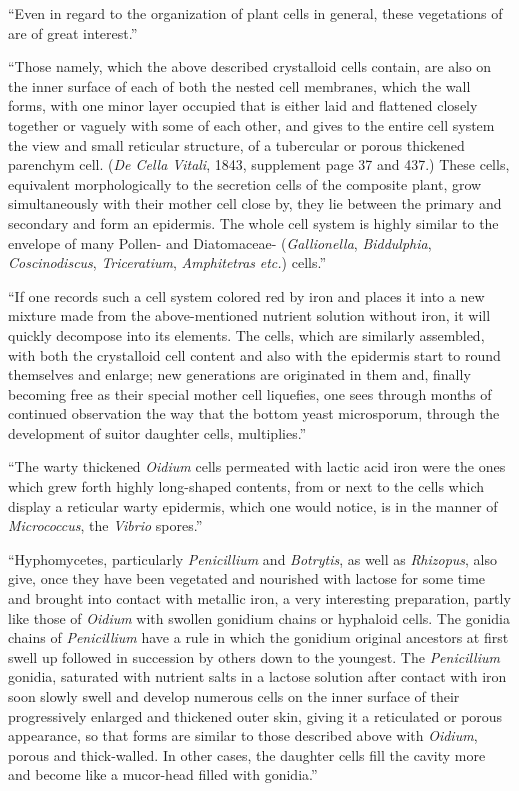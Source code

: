 \documentclass[a4paper, 12pt, oneside]{article}
\begin{document}
``Even in regard to the organization of plant cells in general, these vegetations of are of great interest.''

``Those namely, which the above described crystalloid cells contain, are also on the inner surface of each of both the nested cell membranes, which the wall forms, with one minor layer occupied that is either laid and flattened closely together or vaguely with some of each other, and gives to the entire cell system the view and small reticular structure, of a tubercular or porous thickened parenchym cell. (\emph{De Cella Vitali}, 1843, supplement page 37 and 437.) These cells, equivalent morphologically to the secretion cells of the composite plant, grow simultaneously with their mother cell close by, they lie between the primary and secondary and form an epidermis. The whole cell system is highly similar to the envelope of many Pollen- and Diatomaceae- (\emph{Gallionella}, \emph{Biddulphia}, \emph{Coscinodiscus}, \emph{Triceratium}, \emph{Amphitetras} \emph{etc.}) cells.''

``If one records such a cell system colored red by iron and places it into a new mixture made from the above-mentioned nutrient solution without iron, it will quickly decompose into its elements. The cells, which are similarly assembled, with both the crystalloid cell content and also with the epidermis start to round themselves and enlarge; new generations are originated in them and, finally becoming free as their special mother cell liquefies, one sees through months of continued observation the way that the bottom yeast microsporum, through the development of suitor daughter cells, multiplies.''

``The warty thickened \emph{Oidium} cells permeated with lactic acid iron were the ones which grew forth highly long-shaped contents, from or next to the cells which display a reticular warty epidermis, which one would notice, is in the manner of \emph{Micrococcus}, the \emph{Vibrio} spores.''

``Hyphomycetes, particularly \emph{Penicillium} and \emph{Botrytis}, as well as \emph{Rhizopus}, also give, once they have been vegetated and nourished with lactose for some time and brought into contact with metallic iron, a very interesting preparation, partly like those of \emph{Oidium} with swollen gonidium chains or hyphaloid cells. The gonidia chains of \emph{Penicillium} have a rule in which the gonidium original ancestors at first swell up followed in succession by others down to the youngest. The \emph{Penicillium} gonidia, saturated with nutrient salts in a lactose solution after contact with iron soon slowly swell and develop numerous cells on the inner surface of their progressively enlarged and thickened outer skin, giving it a reticulated or porous appearance, so that forms are similar to those described above with \emph{Oidium}, porous and thick-walled. In other cases, the daughter cells fill the cavity more and become like a mucor-head filled with gonidia.''
\end{document}
